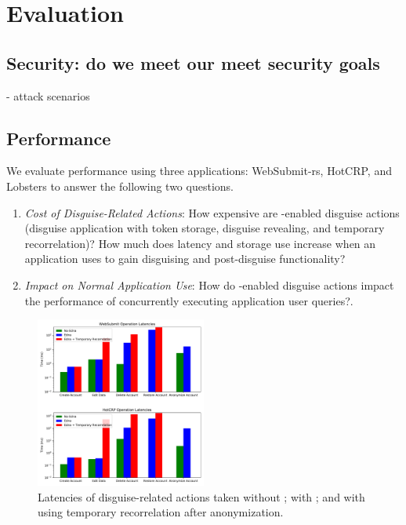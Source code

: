 \section{Evaluation}
\subsection{Security: do we meet our meet security goals}
   - attack scenarios

\subsection{Performance}

We evaluate performance using three applications: WebSubmit-rs, HotCRP, and Lobsters to answer the
following two questions.
\begin{enumerate}
    \item \emph{Cost of Disguise-Related Actions}: How expensive are \sys-enabled disguise actions
(disguise application with token storage, disguise revealing, and temporary recorrelation)?
How much does latency and storage use increase when an application uses \sys
to gain disguising and post-disguise functionality?
\item \emph{Impact on Normal Application Use}: How do \sys-enabled disguise actions impact the performance of concurrently executing
application user queries?.
\end{enumerate}

\begin{figure}[h!]
    \centering
        \includegraphics[width=0.5\textwidth]{figs/client_op_stats}
    \caption{Latencies of disguise-related actions 
    taken without \sys; with \sys;
    and with \sys using temporary recorrelation after anonymization. 
    } 
    \label{fig:client_opstats}
\end{figure}

